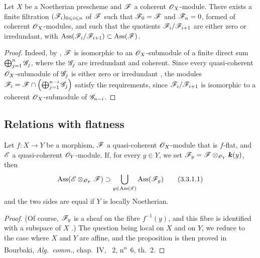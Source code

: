 \begin{corollary}[3.2.8]
\label{IV.3.2.8}
Let $X$ be a Noetherian prescheme and $\mathscr{F}$ a coherent $\mathscr{O}_X$-module.
There exists a finite filtration $(\mathscr{F}_i)_{0\leqslant i\leqslant n}$ of $\mathscr{F}$ such that $\mathscr{F}_0=\mathscr{F}$ and $\mathscr{F}_n=0$, formed of coherent $\mathscr{O}_X$-modules, and such that the quotients $\mathscr{F}_i/\mathscr{F}_{i+1}$ are either zero or irredundant, with $\operatorname{Ass}(\mathscr{F}_i/\mathscr{F}_{i+1})\subset\operatorname{Ass}(\mathscr{F})$.
\end{corollary}

\begin{proof}
Indeed, by , $\mathscr{F}$ is isomorphic to an $\mathscr{O}_X$-submodule of a finite direct sum $\bigoplus_{j=1}^n\mathscr{G}_j$, where the $\mathscr{G}_j$ are irredundant and coherent.  Since every quasi-coherent $\mathscr{O}_X$-submodule of $\mathscr{G}_j$ is either zero or irredundant , the modules $\mathscr{F}_i=\mathscr{F}\cap\left(\bigoplus_{j=1}^{n-i}\mathscr{G}_j\right)$
satisfy the requirements, since $\mathscr{F}_i/\mathscr{F}_{i+1}$ is isomorphic to a coherent $\mathscr{O}_X$-submodule of $\mathscr{G}_{n-i}$.
\end{proof}

\subsection{Relations with flatness}
\label{subsection:IV.3.3}

\begin{proposition}[3.3.1]
\label{IV.3.3.1}
Let $f:X\to Y$ be a morphism, $\mathscr{F}$ a quasi-coherent $\mathscr{O}_X$-module that is $f$-flat, and $\mathscr{E}$ a quasi-coherent $\mathscr{O}_Y$-module.
If, for every $y\in Y$, we set $\mathscr{F}_y=\mathscr{F}\otimes_{\mathscr{O}_Y}\boldsymbol{k}(y)$, then
\[
\label{IV.3.3.1.1}
\operatorname{Ass}(\mathscr{E}\otimes_{\mathscr{O}_Y}\mathscr{F})\supset\bigcup_{y\in\operatorname{Ass}(\mathscr{E})}\operatorname{Ass}(\mathscr{F}_y)
\tag{3.3.1.1}
\]
and the two sides are equal if $Y$ is locally Noetherian.
\end{proposition}

\begin{proof}
(Of course, $\mathscr{F}_y$ is a sheaf on the fibre $f^{-1}(y)$, and this fibre is identified with a subspace of $X$ .)
The question being local on $X$ and on $Y$, we reduce to the case where $X$ and $Y$ are affine, and the proposition is then proved in Bourbaki, \emph{Alg.\ comm.}, chap.~IV, \textsection~2, n\textsuperscript{o}~6, th.~2.
\end{proof}

